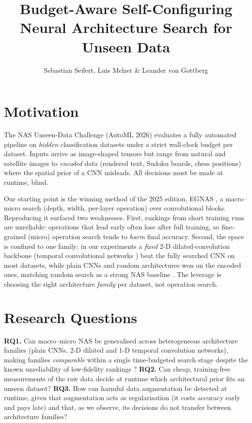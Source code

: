 \documentclass[10pt,twocolumn]{article}
\title{\vspace{-0.9cm}\textbf{Budget-Aware Self-Configuring\\Neural Architecture Search for Unseen Data}\vspace{-0.15cm}}
\author{Sebastian Seifert, Luis Melzer \& Leander von Gottberg}
\date{\vspace{-0.65cm}}
\begin{document}
\maketitle

\section{Motivation}
The NAS Unseen-Data Challenge (AutoML 2026) evaluates a fully automated
pipeline on \emph{hidden} classification datasets under a strict
wall-clock budget per dataset. Inputs arrive as image-shaped tensors but
range from natural and satellite images to \emph{encoded} data (rendered
text, Sudoku boards, chess positions) where the spatial prior of a CNN
misleads. All decisions must be made at runtime, blind.

Our starting point is the winning method of the 2025 edition, EGNAS
\cite{egnas}, a macro--micro search (depth, width, per-layer operation)
over convolutional blocks. Reproducing it surfaced two
weaknesses. First, rankings from short training runs are unreliable:
operations that lead early often lose after full training, so fine-grained
(micro) operation search tends to \emph{harm} final accuracy. Second, the
space is confined to one family: in our experiments a \emph{fixed} 2-D
dilated-convolution backbone (temporal convolutional networks \cite{tcn})
beat the fully searched CNN on most datasets, while plain CNNs and random
architectures won on the encoded ones, matching random search as a strong
NAS baseline \cite{geada,li2019}. The leverage is choosing the right
architecture \emph{family} per dataset, not operation search.

\section{Research Questions}
\textbf{RQ1.} Can macro--micro NAS \cite{egnas} be generalised across
heterogeneous architecture families (plain CNNs, 2-D dilated and 1-D
temporal convolution networks), making families \emph{comparable} within a
single time-budgeted search stage despite the known unreliability of
low-fidelity rankings \cite{white2021}?
\textbf{RQ2.} Can cheap, training-free measurements of the raw data decide
at runtime which architectural prior fits an unseen dataset?
\textbf{RQ3.} How can harmful data augmentation be detected at runtime,
given that augmentation acts as regularisation (it costs accuracy early
and pays late) and that, as we observe, its decisions do not transfer
between architecture families?
\end{document}
